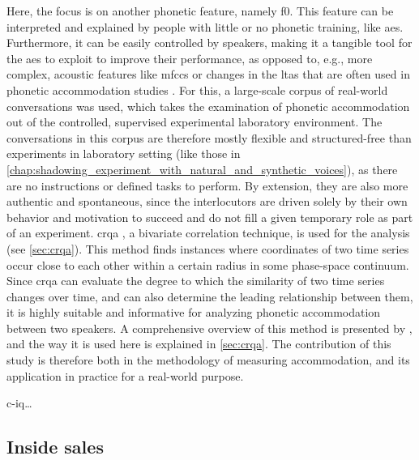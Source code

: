 Here, the focus is on another phonetic feature, namely \ac{f0}.
This feature can be interpreted and explained by people with little or no phonetic training, like \acp{ae}.
Furthermore, it can be easily controlled by speakers, making it a tangible tool for the \acp{ae} to exploit to improve their performance, as opposed to, e.g., more complex, acoustic features like \acp{mfcc} or changes in the \ac{ltas} that are often used in phonetic accommodation studies \citep{Levitan2011measuring, Borrie2019syncing}.
For this, a large-scale corpus of real-world conversations was used, which takes the examination of phonetic accommodation out of the controlled, supervised experimental laboratory environment.
The conversations in this corpus are therefore mostly flexible and structured-free than experiments in laboratory setting (like those in \cref{chap:shadowing_experiment_with_natural_and_synthetic_voices}), as there are no instructions or defined tasks to perform.
By extension, they are also more authentic and spontaneous, since the interlocutors are driven solely by their own behavior and motivation to succeed and do not fill a given temporary role as part of an experiment.
\Ac{crqa} \citep{Zbilut1998detecting}, a bivariate correlation technique, is used for the analysis (see \cref{sec:crqa}).
This method finds instances where coordinates of two time series occur close to each other within a certain radius in some phase-space continuum.
Since \ac{crqa} can evaluate the degree to which the similarity of two time series changes over time, and can also determine the leading relationship between them, it is highly suitable and informative for analyzing phonetic accommodation between two speakers.
A comprehensive overview of this method is presented by \citet{Wallot2018analyzing}, and the way it is used here is explained in \cref{sec:crqa}.
The contribution of this study is therefore both in the methodology of measuring accommodation, and its application in practice for a real-world purpose.

\Acf{c-iq}\ldots

\subsection{Inside sales}
\label{subsec:inside_sales}

